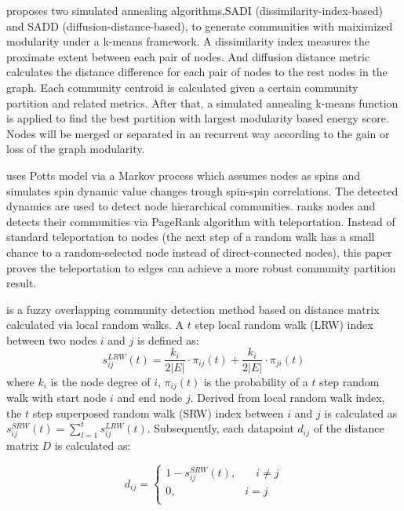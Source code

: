 \cite{liu2010detecting} proposes two simulated annealing algorithms,SADI (dissimilarity-index-based) and SADD (diffusion-distance-based), to generate communities with maiximized modularity under a k-means framework. A dissimilarity index measures the proximate extent between each pair of nodes. And diffusion distance metric calculates the distance difference for each pair of nodes to the rest nodes in the graph.  Each community centroid is calculated given a certain community partition and related metrics. After that, a simulated annealing k-means function is applied to find the best partition with largest modularity based energy score.  Nodes will be merged or separated in an recurrent way according to the gain or loss of the graph modularity.

\cite{li2012potts} uses Potts model via a Markov process which assumes nodes as spins and simulates spin dynamic value changes trough spin-spin correlations.  The detected dynamics are used to detect node hierarchical communities. \cite{lambiotte2012ranking} ranks nodes and detects their communities via PageRank algorithm with teleportation. Instead of standard teleportation to nodes (the next step of a random walk has a small chance to a random-selected node instead of direct-connected nodes), this paper proves the teleportation to edges can achieve a more robust community partition result.

\cite{wang2013fuzzy} is a fuzzy overlapping community detection method based on distance matrix calculated via local random walks. A $t$ step local random walk (LRW) index between two nodes $i$ and $j$ is defined as:
\begin{equation}
s_{ij}^{LRW}(t) = \frac{k_i}{2|E|}\cdot \pi_{ij}(t) + \frac{k_i}{2|E|}\cdot \pi_{ji}(t)
\end{equation}
where $k_i$ is the node degree of $i$, $ \pi_{ij}(t)$ is the probability of a $t$ step random walk with start node $i$ and end node $j$. Derived from local random walk index, the $t$ step superposed random walk (SRW) index between $i$ and $j$ is calculated as $s_{ij}^{SRW}(t) = \sum_{l=1}^{t}s_{ij}^{LRW}(t)$. Subsequently, each datapoint $d_{ij}$ of the distance matrix $D$ is calculated as:

\begin{equation}
d_{ij}=
\begin{cases}
1- s_{ij}^{SRW}(t),    & \quad  i \neq j\\ 
0,  & i = j\\ 
\end{cases}
\end{equation}

